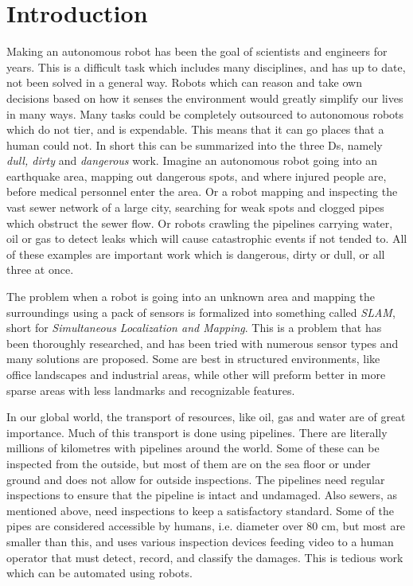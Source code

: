 
\chapter{Introduction}
Making an autonomous robot has been the goal of scientists and engineers for years. This
is a difficult task which includes many disciplines, and has up to date, not been solved in
a general way. Robots which can reason and take own decisions based on how it senses the
environment would greatly simplify our lives in many ways. Many tasks could be completely
outsourced to autonomous robots which do not tier, and is expendable. This means that it
can go places that a human could not. In short this can be summarized into the three Ds,
namely \emph{dull, dirty} and \emph{dangerous} work. Imagine an autonomous robot going
into an earthquake area, mapping out dangerous spots, and where injured people are,
before medical personnel enter the area. Or a robot mapping and inspecting the vast sewer
network of a large city, searching for weak spots and clogged pipes which obstruct the
sewer flow. Or robots crawling the pipelines carrying water, oil or gas to detect leaks
which will cause catastrophic events if not tended to. All of these examples are important work which
is dangerous, dirty or dull, or all three at once.

The problem when a robot is going into an unknown area and mapping the surroundings using
a pack of sensors is formalized into something called \emph{SLAM}, short for
\emph{Simultaneous Localization and Mapping}.
This is a problem that has been thoroughly researched, and has been tried with numerous sensor types
and many solutions are proposed. Some are best in structured environments, like office
landscapes and industrial areas, while other will preform better in more sparse areas with
less landmarks and recognizable features. 

In our global world, the transport of resources, like oil, gas and water are of great importance. Much of this
transport is done using pipelines. There are literally millions of kilometres with pipelines around
the world. Some of these can be inspected from the outside, but most of them are on the
sea floor or under ground and does not allow for outside inspections. 
The pipelines need regular inspections to ensure that the pipeline is intact
and undamaged. Also sewers, as mentioned above, need inspections to keep a satisfactory
standard. Some of the pipes are considered accessible by humans, i.e. diameter over 80 cm,
but most are smaller than this, and uses various inspection devices feeding video to a human
operator that must detect, record, and classify the damages. This is tedious work which
can be automated using robots. \cite{MAKRO-project}

